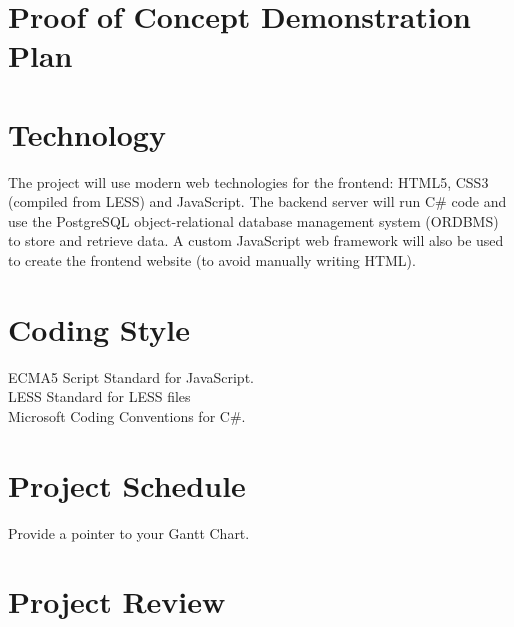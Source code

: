 \documentclass{article}
\begin{document}
\section{Proof of Concept Demonstration Plan}

\section{Technology}
The project will use modern web technologies for the frontend: HTML5, CSS3
(compiled from LESS) and JavaScript. The backend server will run C\# code and
use the PostgreSQL object-relational database management system (ORDBMS) to
store and retrieve data. A custom JavaScript web framework will also be used to
create the frontend website (to avoid manually writing HTML).

\section{Coding Style}
ECMA5 Script Standard for JavaScript.\\
LESS Standard for LESS files\\
Microsoft Coding Conventions for C\#.

\section{Project Schedule}

Provide a pointer to your Gantt Chart.

\section{Project Review}
\end{document}
